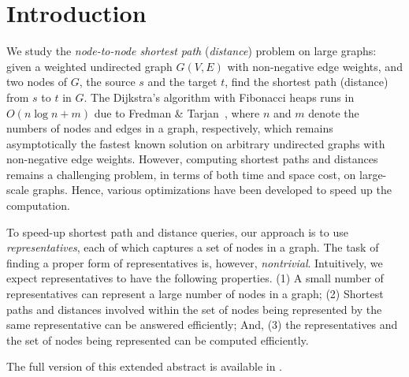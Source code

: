 \section{Introduction}
\label{sec-intro}


We study the {\em node-to-node shortest path} ({\em distance}) problem on large graphs: given a weighted undirected graph $G(V, E)$ with non-negative edge weights, and two nodes of $G$, the source $s$ and the target $t$, find the shortest path (distance) from $s$ to $t$ in $G$. 
The Dijkstra's algorithm with Fibonacci heaps runs in $O(n\log n + m)$ due to Fredman \& Tarjan~\cite{CormenLRS01}, where $n$ and $m$ denote the numbers of nodes and edges in a graph, respectively, which remains asymptotically the fastest known solution on arbitrary undirected graphs with non-negative edge weights.
However, computing shortest  paths and distances remains a challenging problem, in terms of both time and space cost, on large-scale graphs. Hence, various optimizations have been developed to speed up the computation. 

To speed-up shortest  path and distance queries, our approach is to use {\em representatives}, each of which captures a set of nodes in a graph. The task of finding a proper form of representatives is, however, {\em nontrivial}. Intuitively, we expect representatives to have the following properties.
%
(1) A small number of representatives can represent a large number of nodes in a graph;
%
(2) Shortest paths and distances involved within the set of nodes being represented by the same representative can be answered efficiently; And,
%
(3) the representatives and the set of nodes being represented can be computed efficiently.

The full version of this extended abstract is available in \cite{journal-version2016}.

